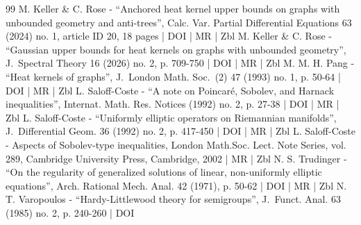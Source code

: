 \begin{thebibliography}{99}
M. Keller \& C. Rose - “Anchored heat kernel upper bounds on graphs with unbounded geometry and anti-trees”, Calc. Var. Partial Differential Equations 63 (2024) no. 1, article ID 20, 18 pages | DOI | MR | Zbl
M. Keller \& C. Rose - “Gaussian upper bounds for heat kernels on graphs with unbounded geometry”, J. Spectral Theory 16 (2026) no. 2, p. 709-750 | DOI | MR | Zbl
M. M. H. Pang - “Heat kernels of graphs”, J. London Math. Soc. (2) 47 (1993) no. 1, p. 50-64 | DOI | MR | Zbl
L. Saloff-Coste - “A note on Poincaré, Sobolev, and Harnack inequalities”, Internat. Math. Res. Notices (1992) no. 2, p. 27-38 | DOI | MR | Zbl
L. Saloff-Coste - “Uniformly elliptic operators on Riemannian manifolds”, J. Differential Geom. 36 (1992) no. 2, p. 417-450 | DOI | MR | Zbl
L. Saloff-Coste - Aspects of Sobolev-type inequalities, London Math.Soc. Lect. Note Series, vol. 289, Cambridge University Press, Cambridge, 2002 | MR | Zbl
N. S. Trudinger - “On the regularity of generalized solutions of linear, non-uniformly elliptic equations”, Arch. Rational Mech. Anal. 42 (1971), p. 50-62 | DOI | MR | Zbl
N. T. Varopoulos - “Hardy-Littlewood theory for semigroups”, J. Funct. Anal. 63 (1985) no. 2, p. 240-260 | DOI
\end{thebibliography}
